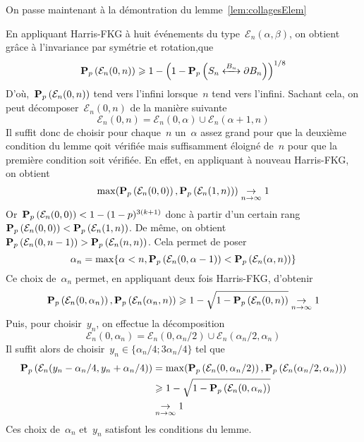 		On passe maintenant à la démontration du lemme~\ref{lem:collagesElem} %
		\begin{dem}
			En appliquant Harris-FKG à huit événements du type~$\mathcal{E}_n(\alpha, \beta)$, on obtient grâce à l'invariance par symétrie et rotation,que
			\[
				\Pp{\mathcal{E}_n(0,n)} \geq 1 - \left(1 - \Pp{\relie[B_n]{S_n}{\partial B_n}} \right)^{1/8} %
			\]
			D'où,~$\bm{\mathrm{P}}_{p}\left(\mathcal{E}_n(0, n)\right)$ tend vers l'infini lorsque~$n$ tend vers l'infini. Sachant cela, on peut décomposer~$\mathcal{E}_n(0, n)$ de la manière suivante 
			\[
				\mathcal{E}_n(0, n) = \mathcal{E}_n(0, \alpha) \cup \mathcal{E}_n(\alpha + 1, n) %
			\]
			Il suffit donc de choisir pour chaque~$n$ un~$\alpha$ assez grand pour que la deuxième condition du lemme qoit vérifiée mais suffisamment éloigné de~$n$ pour que la première condition soit vérifiée. En effet, en appliquant à nouveau Harris-FKG, on obtient
			\[
				\max(\Pp{\mathcal{E}_n(0, 0)}, \Pp{\mathcal{E}_n(1, n)}) \underset{n \to \infty}{\to} 1 %
			\]
			Or~$\bm{\mathrm{P}}_{p}\left(\mathcal{E}_n(0,0)\right) < 1 - (1-p)^{3(k+1)}$ donc à partir d'un certain rang~$\bm{\mathrm{P}}_{p}\left(\mathcal{E}_n(0,0)\right) < \bm{\mathrm{P}}_{p}\left(\mathcal{E}_n(1, n)\right)$. De même, on obtient~$\bm{\mathrm{P}}_{p}\left(\mathcal{E}_n(0, n-1)\right) > \bm{\mathrm{P}}_{p}\left(\mathcal{E}_n(n, n)\right)$. Cela permet de poser %
			\[
				\alpha_n = \max \{ \alpha < n, \Pp{\mathcal{E}_n(0, \alpha - 1)} < \Pp{\mathcal{E}_n(\alpha, n)} \} %
			\]
			Ce choix de~$\alpha_n$ permet, en appliquant deux fois Harris-FKG, d'obtenir
			\[
				\Pp{\mathcal{E}_n(0, \alpha_n)}, \Pp{\mathcal{E}_n(\alpha_n, n)} \geq 1 - \sqrt{1  - \Pp{\mathcal{E}_n(0, n)}} \underset{n \to \infty}{\to} 1 %
			\]
			Puis, pour choisir~$y_n$, on effectue la décomposition
			\[
				\mathcal{E}_n(0, \alpha_n) = \mathcal{E}_n(0, \alpha_n/2) \cup \mathcal{E}_n(\alpha_n/2, \alpha_n) %
			\]
			Il suffit alors de choisir~$y_n \in \{ \alpha_n/4 ; 3\alpha_n/4 \}$ tel que
			\begin{align*} 
				\Pp{\mathcal{E}_n(y_n - \alpha_n/4, y_n + \alpha_n/4)} 
					& = \max(\Pp{\mathcal{E}_n (0, \alpha_n/2)}, \Pp{\mathcal{E}_n (\alpha_n/2, \alpha_n)}) \\
				       	& \geq 1 - \sqrt{1 - \Pp{\mathcal{E}_n(0, \alpha_n)}} \\ 
					& \underset{n \to \infty}{\to} 1 %
			\end{align*}
			Ces choix de~$\alpha_n$ et~$y_n$ satisfont les conditions du lemme.
		\end{dem}

